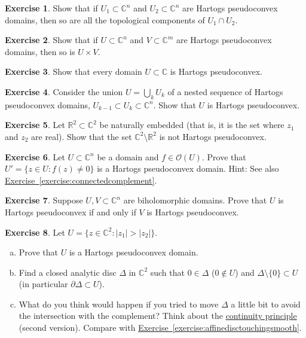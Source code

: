 \documentclass[12pt,openany]{book}
\newcommand{\sabs}[1]{\lvert {#1} \rvert}
\newcommand{\C}{{\mathbb{C}}}
\newcommand{\R}{{\mathbb{R}}}
\newcommand{\sO}{{\mathscr{O}}}
\theoremstyle{plain}
\theoremstyle{remark}
\theoremstyle{definition}
\newenvironment{exbox}{%
    \def\FrameCommand{\vrule width 1pt \relax\hspace{10pt}}%
    \MakeFramed{\advance\hsize-\width\FrameRestore}%
}{%
    \endMakeFramed
}
\newenvironment{exparts}{%
    \leavevmode\begin{enumerate}[a),noitemsep,topsep=0pt,parsep=0pt,partopsep=0pt]
}{%
    \end{enumerate}
}
\theoremstyle{exercise}
\newtheorem{exercise}{Exercise}[section]
\theoremstyle{example}
\newcommand{\exerciseref}[1]{\hyperref[#1]{Exercise~\ref*{#1}}}
\begin{document}
\begin{exbox}
\begin{exercise} \label{exercise:intersectionhpseudo}
Show that if $U_1 \subset \C^n$ and $U_2 \subset \C^n$ are Hartogs
pseudoconvex domains, then so are all the topological components of $U_1 \cap U_2$.
\end{exercise}

\begin{exercise}
Show that if $U \subset \C^n$ and $V \subset \C^m$ are Hartogs
pseudoconvex domains, then so is $U \times V$.
\end{exercise}

\begin{exercise}
Show that every domain $U \subset \C$ is Hartogs pseudoconvex.
\end{exercise}

\begin{exercise} \label{exercise:nestedunions}
Consider the union $U = \bigcup_k U_k$ of a nested sequence of Hartogs pseudoconvex
domains, $U_{k-1} \subset U_k \subset \C^n$.  Show that $U$ is Hartogs pseudoconvex.
\end{exercise}

\begin{exercise}
Let $\R^2 \subset \C^2$ be naturally embedded (that is, it is the
set where $z_1$ and $z_2$ are real).  Show that the set $\C^2 \setminus
\R^2$ is not Hartogs pseudoconvex.
\end{exercise}

\begin{exercise}
Let $U \subset \C^n$ be a domain and $f \in \sO(U)$.  Prove that
$U' = \bigl\{ z \in U : f(z) \not= 0 \bigr\}$ is a Hartogs pseudoconvex
domain.  Hint: See also \exerciseref{exercise:connectedcomplement}.
\end{exercise}

\begin{exercise} \label{exercise:biholHartogs}
Suppose $U,V \subset \C^n$ are biholomorphic domains.
Prove that $U$ is Hartogs pseudoconvex if and only if $V$ is
Hartogs pseudoconvex.
\end{exercise}

\begin{exercise}
Let $U = \bigl\{ z \in \C^2 : \sabs{z_1} > \sabs{z_2} \bigr\}$.
\begin{exparts}
\item
Prove that $U$ is a Hartogs pseudoconvex domain.
\item
Find a closed analytic disc $\Delta$ in $\C^2$ such that $0 \in \Delta$
($0 \notin U$)
and $\Delta \setminus \{ 0 \} \subset U$ (in particular $\partial \Delta
\subset U$).
\item
What do you think would happen if you tried to move $\Delta$ a
little bit to avoid the intersection with the complement?
Think about the \hyperref[thm:contprinciple2]{continuity principle}
(second version).
Compare with \exerciseref{exercise:affinedisctouchingsmooth}.
\end{exparts}
\end{exercise}


\end{exbox}
\end{document}
